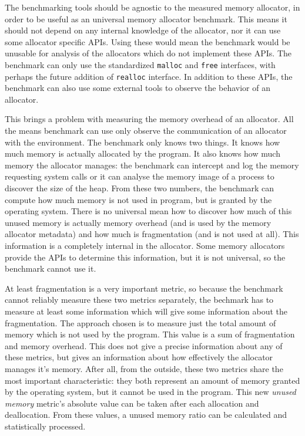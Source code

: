 The benchmarking tools should be agnostic to the measured memory allocator, in order to be useful as an universal memory allocator benchmark. This means it should not depend on any internal knowledge of the allocator, nor it can use some allocator specific APIs. Using these would mean the benchmark would be unusable for analysis of the allocators which do not implement these APIs. The benchmark can only use the standardized {\tt malloc} and {\tt free} interfaces, with perhaps the future addition of {\tt realloc} interface. In addition to these APIs, the benchmark can also use some external tools to observe the behavior of an allocator.

This brings a problem with measuring the memory overhead of an allocator. All the means benchmark can use only observe the communication of an allocator with the environment. The benchmark only knows two things. It knows how much memory is actually allocated by the program. It also knows how much memory the allocator manages: the benchmark can intercept and log the memory requesting system calls or it can analyse the memory image of a process to discover the size of the heap. From these two numbers, the benchmark can compute how much memory is not used in program, but is granted by the operating system. There is no universal mean how to discover how much of this unused memory is actually memory overhead (and is used by the memory allocator metadata) and how much is fragmentation (and is not used at all). This information is a completely internal in the allocator. Some memory allocators provide the APIs to determine this information, but it is not universal, so the benchmark cannot use it.

At least fragmentation is a very important metric, so because the benchmark cannot reliably measure these two metrics separately, the bechmark has to measure at least some information which will give some information about the fragmentation. The approach chosen is to measure just the total amount of memory which is not used by the program. This value is a sum of fragmentation and memory overhead. This does not give a precise information about any of these metrics, but gives an information about how effectively the allocator manages it's memory. After all, from the outside, these two metrics share the most important characteristic: they both represent an amount of memory granted by the operating system, but it cannot be used in the program. This new {\em unused memory} metric's absolute value can be taken after each allocation and deallocation. From these values, a unused memory ratio can be calculated and statistically processed.

